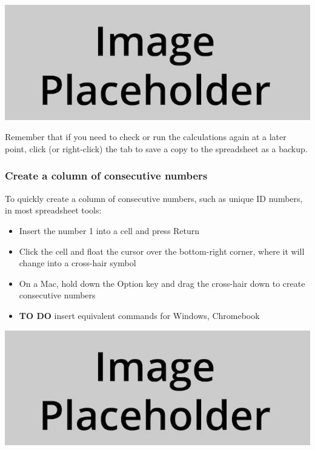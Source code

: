 \documentclass[
  english,
]{book}
\providecommand{\tightlist}{%
  \setlength{\itemsep}{0pt}\setlength{\parskip}{0pt}}
\begin{document}
\includegraphics{images/placeholder.jpg}

Remember that if you need to check or run the calculations again at a later point, click (or right-click) the tab to save a copy to the spreadsheet as a backup.

\hypertarget{create-a-column-of-consecutive-numbers}{%
\subsubsection*{Create a column of consecutive numbers}\label{create-a-column-of-consecutive-numbers}}

To quickly create a column of consecutive numbers, such as unique ID numbers, in most spreadsheet tools:

\begin{itemize}
\tightlist
\item
  Insert the number 1 into a cell and press Return
\item
  Click the cell and float the cursor over the bottom-right corner, where it will change into a cross-hair symbol
\item
  On a Mac, hold down the Option key and drag the cross-hair down to create consecutive numbers
\item
  \textbf{TO DO} insert equivalent commands for Windows, Chromebook
\end{itemize}

\includegraphics{images/placeholder.jpg}
\end{document}
